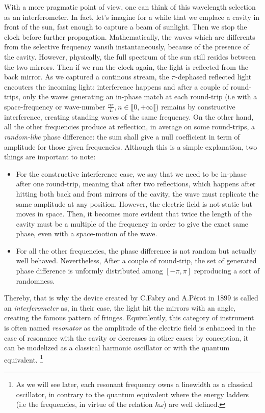 \documentclass[12pt]{report}
\begin{document}
With a more pragmatic point of view, one can think of this wavelength selection as an interferometer. In fact, let's imagine for a while that we emplace a cavity in front of the sun, fast enough to capture a beam of sunlight. Then we stop the clock before further propagation. Mathematically, the waves which are differents from the selective frequency vansih instantaneously, because of the presence of the cavity. However, physically, the full spectrum of the sun still resides between the two mirrors. Then if we run the clock again, the light is reflected from the back mirror. As we captured a continous stream, the $\pi$-dephased reflected light encouters the incoming light: interference happens and after a couple of round-trips, only the waves generating an in-phase match at each round-trip (i.e with a space-frequency or wave-number $\frac{n\pi}{L}, n\in \llbracket 0, +\infty \llbracket $) remains by constructive interference, creating standing waves of the same frequency. On the other hand, all the other frequencies produce at reflection, in average on some round-trips, a \textit{random-like} phase difference: the sum shall give a null coefficient in term of amplitude for those given frequencies. Although this is a simple explanation, two things are important to note:
\begin{itemize}
  \item For the constructive interference case, we say that we need to be in-phase after one round-trip, meaning that after two reflections, which happens after hitting both back and front mirrors of the cavity, the wave must replicate the same amplitude at any position. However, the electric field is not static but moves in space. Then, it becomes more evident that twice the length of the cavity must be a multiple of the frequency in order to give the exact same phase, even with a space-motion of the wave.
  \item  For all the other frequencies, the phase difference is not random but actually well behaved. Nevertheless, After a couple of round-trip, the set of generated phase difference is unformly distributed among $ \left[ -\pi, \pi \right] $ reproducing a sort of randomness.
\end{itemize}

Thereby, that is why the device created by C.Fabry and A.Pérot in 1899 is called an \textit{interferometer} as, in their case, the light hit the mirrors with an angle, creating the famous pattern of fringes. Equivalently, this category of instrument is often named \textit{resonator} as the amplitude of the electric field is enhanced in the case of resonance with the cavity or decreases in other cases: by conception, it can be modelized as a classical harmonic oscillator or with the quantum equivalent. \footnote{As we will see later, each resonant frequency owns a linewidth as a classical oscillator, in contrary to the quantum equivalent where the energy ladders (i.e the frequencies, in virtue of the relation $ \hbar \omega$) are well defined.}
\end{document}
